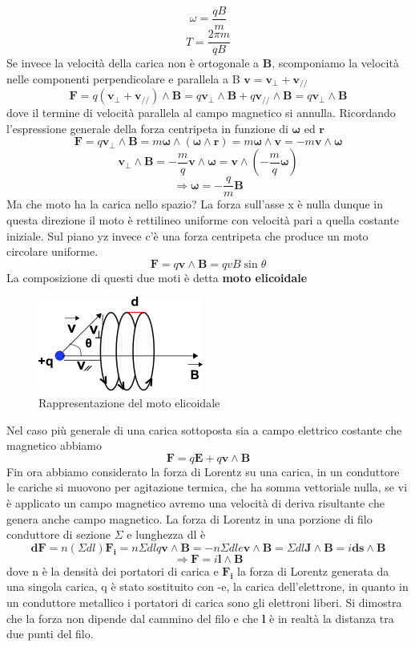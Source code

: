 \documentclass[
10pt, %
a4paper, %
oneside, %
headinclude,footinclude, %
BCOR5mm, %
]{scrartcl}
\begin{document}
\[\omega=\frac{qB}{m}\]
\[T=\frac{2\pi m }{qB}\]
Se invece la velocità della carica non è ortogonale a $\mathbf{B}$, scomponiamo la velocità nelle componenti perpendicolare e parallela a B \(\mathbf{v}=\mathbf{v_{\perp}}+\mathbf{v_{//}}\)
\[\mathbf{F} = q(\mathbf{v_{\perp}}+\mathbf{v_{//}})\wedge \mathbf{B}=q\mathbf{v_{\perp}}\wedge \mathbf{B}+q\mathbf{v_{//}}\wedge \mathbf{B}= q\mathbf{v_{\perp}}\wedge \mathbf{B} \] 
dove il termine di velocità parallela al campo magnetico si annulla. Ricordando l'espressione generale della forza centripeta in funzione di $\mathbf{\omega}$ ed $\mathbf{r}$
\[\mathbf{F}= q\mathbf{v_{\perp}}\wedge \mathbf{B}= m \mathbf{\omega}\wedge(\mathbf{\omega}\wedge\mathbf{r})= m\mathbf{\omega}\wedge\mathbf{v}= -m\mathbf{v}\wedge\mathbf{\omega} \] 
\[\mathbf{v_{\perp}}\wedge \mathbf{B}= -\frac{m}{q}\mathbf{v}\wedge\mathbf{\omega} =\mathbf{v}\wedge\left(-\frac{m}{q}\mathbf{\omega}\right) \]
\[\Rightarrow \mathbf{\omega}= -\frac{q}{m}\mathbf{B}\]
Ma che moto ha la carica nello spazio? La forza sull'asse x è nulla dunque in questa direzione il moto è rettilineo uniforme con velocità pari a quella costante iniziale. Sul piano yz invece c'è una forza centripeta che produce un moto circolare uniforme.
\[\mathbf{F}= q\mathbf{v}\wedge\mathbf{B}= qvB\sin\theta\]
La composizione di questi due moti è detta \textbf{moto elicoidale}
\begin{figure}[h!]
	\centering
	\includegraphics[width=0.5\linewidth]{images/moto_elicoidale}
	\caption{Rappresentazione del moto elicoidale}
	\label{fig:motoelicoidale}
\end{figure}
\FloatBarrier
Nel caso più generale di una carica sottoposta sia a campo elettrico costante che magnetico abbiamo
\[\mathbf{F}= q\mathbf{E}+q\mathbf{v}\wedge\mathbf{B}\]
Fin ora abbiamo considerato la forza di Lorentz su una carica, in un conduttore le cariche si muovono per agitazione termica, che ha somma vettoriale nulla, se vi è applicato un campo magnetico avremo una velocità di deriva risultante che genera anche campo magnetico. La forza di Lorentz in una porzione di filo conduttore di sezione $\Sigma$ e lunghezza dl è
\[\mathbf{dF}=n(\Sigma dl)\mathbf{F_i} = n\Sigma dl q\mathbf{v}\wedge\mathbf{B}= -n\Sigma dl e\mathbf{v}\wedge\mathbf{B} = \Sigma dl \mathbf{J}\wedge\mathbf{B}= i\mathbf{ds}\wedge\mathbf{B}\]  
\[\Rightarrow \mathbf{F}=i\mathbf{l}\wedge\mathbf{B}\]
dove n è la densità dei portatori di carica e \(\mathbf{F_i}\) la forza di Lorentz generata da una singola carica, q è stato sostituito con -e, la carica dell'elettrone, in quanto in un conduttore metallico i portatori di carica sono gli elettroni liberi. Si dimostra che la forza non dipende dal cammino del filo e che $\mathbf{l}$ è in realtà la distanza tra due punti del filo.  
\end{document}
